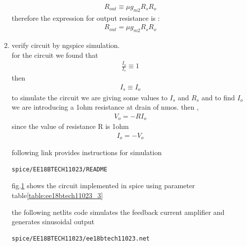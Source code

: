 \begin{enumerate}[label=\thesection.\arabic*.,ref=\thesection.\theenumi]
\begin{align}
    R_{out} \equiv \mu g_{m2}R_s R_o
     \label{eq_ee18btech11023_49}
\end{align}
therefore the expression for output resistance is :
\begin{align}
    R_{out} = \mu g_{m2}R_s R_o
     \label{eq_ee18btech11023_50}
\end{align}
\item
verify circuit by ngspice simulation.\\
for the circuit we found that 
\begin{align}
    \frac{I_o}{I_s} \equiv 1 
    \label{eq_ee18btech11023_51}
\end{align}
then 
\begin{align}
    I_s \equiv I_o
\end{align}
to simulate the circuit we are giving some values to $I_s$ and $R_s$
and to find $I_o$ we are introducing a  1ohm resistance at drain of nmos.
then , 
\begin{align}
    V_o = -RI_o
    \label{eq_ee18btech11023_52}
\end{align}
since the value of resistance R is 1ohm
\begin{align}
    I_o = -V_o
    \label{eq_ee18btech11023_53}
\end{align}
\begin{table}[]
    \centering
  	\resizebox{\columnwidth}{!}{}
    \caption{}
    \label{table:ee18btech11023_3}
\end{table}
following link provides instructions for simulation
 \begin{lstlisting}
spice/EE18BTECH11023/README
\end{lstlisting}
fig.\ref{fig:spice fig} shows the circuit implemented in spice using parameter table\ref{table:ee18btech11023_3}
\begin{figure}[!ht]
	\begin{center}
			\resizebox{\columnwidth}{!}{}
	\end{center}
\caption{}
\label{fig:spice fig}
\end{figure}



the following netlits code simulates the feedback current amplifier and generates sinusoidal output 
 \begin{lstlisting}
spice/EE18BTECH11023/ee18btech11023.net
\end{lstlisting}


\end{enumerate}
